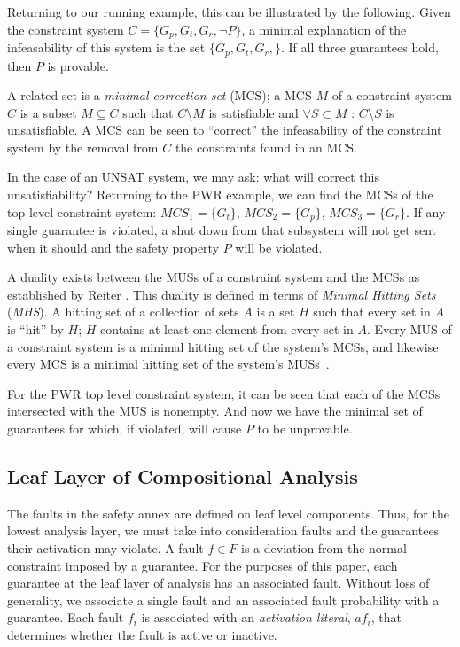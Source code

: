 Returning to our running example, this can be illustrated by the following. Given the constraint system $C = \{G_p, G_t, G_r, \neg P\}$, a minimal explanation of the infeasability of this system is the set $\{G_p, G_t, G_r,\}$. If all three guarantees hold, then $P$ is provable. 

A related set is a {\em minimal correction set} (MCS); a MCS $M$ of a constraint system $C$ is a subset $M\subseteq C$ such that $C \setminus M$ is satisfiable and $\forall S \subset M$ : $C \setminus S$ is unsatisfiable. A MCS can be seen to ``correct'' the infeasability of the constraint system by the removal from $C$ the constraints found in an MCS.

In the case of an UNSAT system, we may ask: what will correct this unsatisfiability? Returning to the PWR example, we can find the MCSs of the top level constraint system: $MCS_1 = \{G_t\}$, $MCS_2 = \{G_p\}$, $MCS_3 = \{G_r\}$. If any single guarantee is violated, a shut down from that subsystem will not get sent when it should and the safety property $P$ will be violated. 

A duality exists between the MUSs of a constraint system and the MCSs as established by Reiter \cite{reiter1987theory}. This duality is defined in terms of \textit{Minimal Hitting Sets} (\textit{MHS}). A hitting set of a collection of sets $A$ is a set $H$ such that every set in $A$ is ``hit'' by $H$; $H$ contains at least one element from every set in $A$. Every MUS of a constraint system is a minimal hitting set of the system's MCSs, and likewise every MCS is a minimal hitting set of the system's MUSs~\cite{liffiton2016fast, reiter1987theory, de1987diagnosing}.

For the PWR top level constraint system, it can be seen that each of the MCSs intersected with the MUS is nonempty. And now we have the minimal set of guarantees for which, if violated, will cause $P$ to be unprovable. 

\subsection{Leaf Layer of Compositional Analysis}
The faults in the safety annex are defined on leaf level components. Thus, for the lowest analysis layer, we must take into consideration faults and the guarantees their activation may violate. A fault $f \in F$ is a deviation from the normal constraint imposed by a guarantee. For the purposes of this paper, each guarantee at the leaf layer of analysis has an associated fault. Without loss of generality, we associate a single fault and an associated fault probability with a guarantee. Each fault $f_i$ is associated with an \emph{activation literal}, $af_i$, that determines whether the fault is active or inactive. 

